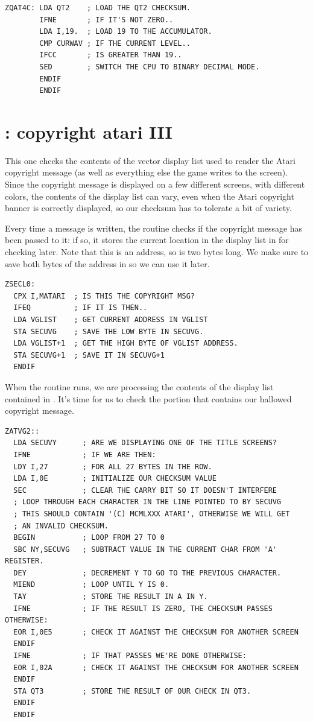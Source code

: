 \begin{lstlisting}
ZQAT4C: LDA QT2    ; LOAD THE QT2 CHECKSUM.
        IFNE       ; IF IT'S NOT ZERO..
        LDA I,19.  ; LOAD 19 TO THE ACCUMULATOR. 
        CMP CURWAV ; IF THE CURRENT LEVEL..
        IFCC       ; IS GREATER THAN 19..
        SED        ; SWITCH THE CPU TO BINARY DECIMAL MODE.
        ENDIF
        ENDIF
\end{lstlisting}

\section*{: copyright atari III}
This one checks the contents of the vector display list used to render
the Atari copyright message (as well as everything else the game writes to the screen).
Since the copyright message is displayed on a few different
screens, with different colors, the contents of the display list can vary,
even when the Atari copyright banner is correctly displayed, so our checksum
has to tolerate a bit of variety.

Every time a message is written, the  routine checks if the
copyright message has been passed to it: if so, it stores the current
location in the display list in  for checking later. Note
that this is an address, so is two bytes long. We make sure to save both
bytes of the address in  so we can use it later.

\begin{lstlisting}
ZSECL0:
  CPX I,MATARI  ; IS THIS THE COPYRIGHT MSG?
  IFEQ          ; IF IT IS THEN..
  LDA VGLIST    ; GET CURRENT ADDRESS IN VGLIST
  STA SECUVG    ; SAVE THE LOW BYTE IN SECUVG.
  LDA VGLIST+1  ; GET THE HIGH BYTE OF VGLIST ADDRESS.
  STA SECUVG+1  ; SAVE IT IN SECUVG+1
  ENDIF
\end{lstlisting}

When the  routine runs, we are processing the contents
of the display list contained in . It's time for us to check
the portion that contains our hallowed copyright message. 
\clearpage
\begin{lstlisting}
ZATVG2::
  LDA SECUVY      ; ARE WE DISPLAYING ONE OF THE TITLE SCREENS?
  IFNE            ; IF WE ARE THEN:
  LDY I,27        ; FOR ALL 27 BYTES IN THE ROW.
  LDA I,0E        ; INITIALIZE OUR CHECKSUM VALUE
  SEC             ; CLEAR THE CARRY BIT SO IT DOESN'T INTERFERE
  ; LOOP THROUGH EACH CHARACTER IN THE LINE POINTED TO BY SECUVG
  ; THIS SHOULD CONTAIN '(C) MCMLXXX ATARI', OTHERWISE WE WILL GET
  ; AN INVALID CHECKSUM.
  BEGIN           ; LOOP FROM 27 TO 0
  SBC NY,SECUVG   ; SUBTRACT VALUE IN THE CURRENT CHAR FROM 'A' REGISTER.
  DEY             ; DECREMENT Y TO GO TO THE PREVIOUS CHARACTER.
  MIEND           ; LOOP UNTIL Y IS 0.
  TAY             ; STORE THE RESULT IN A IN Y.
  IFNE            ; IF THE RESULT IS ZERO, THE CHECKSUM PASSES OTHERWISE:
  EOR I,0E5       ; CHECK IT AGAINST THE CHECKSUM FOR ANOTHER SCREEN
  ENDIF           
  IFNE            ; IF THAT PASSES WE'RE DONE OTHERWISE:
  EOR I,02A       ; CHECK IT AGAINST THE CHECKSUM FOR ANOTHER SCREEN
  ENDIF           
  STA QT3         ; STORE THE RESULT OF OUR CHECK IN QT3.
  ENDIF
  ENDIF
\end{lstlisting}

